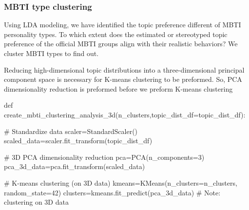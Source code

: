 \documentclass[12pt]{article}
\begin{document}
	
	
	
 	\subsubsection{MBTI type clustering} 
	Using LDA modeling, we have identified the topic preference different of MBTI personality types. To which extent does the estimated or stereotyped topic preference of the official MBTI groups align with their realistic behaviors? We cluster MBTI types to find out.
	
	Reducing high-dimensional topic distributions into a three-dimensional principal component space is necessary for K-means clustering to be preformed. So, PCA dimensionality reduction is preformed before we preform K-means clustering
	\begin{python}
def create_mbti_clustering_analysis_3d(n_clusters,topic_dist_df=topic_dist_df):
    
    # Standardize data
    scaler=StandardScaler()
    scaled_data=scaler.fit_transform(topic_dist_df)
    
    # 3D PCA dimensionality reduction
    pca=PCA(n_components=3)
    pca_3d_data=pca.fit_transform(scaled_data)
    
    # K-means clustering (on 3D data)
    kmeans=KMeans(n_clusters=n_clusters, random_state=42)
    clusters=kmeans.fit_predict(pca_3d_data)  # Note: clustering on 3D data
	\end{python}
\end{document}
